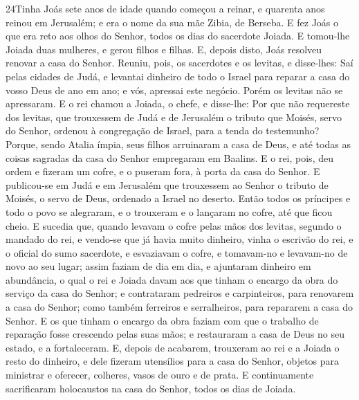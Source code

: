 \lettrine{24} Tinha Joás sete anos de idade quando começou a
reinar, e quarenta anos reinou em Jerusalém; e era o nome da sua mãe
Zibia, de Berseba. E fez Joás o que era reto aos olhos do
Senhor, todos os dias do sacerdote Joiada. E tomou-lhe Joiada
duas mulheres, e gerou filhos e filhas. E, depois disto, Joás
resolveu renovar a casa do Senhor. Reuniu, pois, os sacerdotes e
os levitas, e disse-lhes: Saí pelas cidades de Judá, e levantai
dinheiro de todo o Israel para reparar a casa do vosso Deus de ano
em ano; e vós, apressai este negócio. Porém os levitas não se
apressaram. E o rei chamou a Joiada, o chefe, e disse-lhe: Por
que não requereste dos levitas, que trouxessem de Judá e de
Jerusalém o tributo que Moisés, servo do Senhor, ordenou à
congregação de Israel, para a tenda do testemunho? Porque, sendo
Atalia ímpia, seus filhos arruinaram a casa de Deus, e até todas as
coisas sagradas da casa do Senhor empregaram em Baalins. E o
rei, pois, deu ordem e fizeram um cofre, e o puseram fora, à porta
da casa do Senhor. E publicou-se em Judá e em Jerusalém que
trouxessem ao Senhor o tributo de Moisés, o servo de Deus, ordenado
a Israel no deserto. Então todos os príncipes e todo o povo
se alegraram, e o trouxeram e o lançaram no cofre, até que ficou
cheio. E sucedia que, quando levavam o cofre pelas mãos dos
levitas, segundo o mandado do rei, e vendo-se que já havia muito
dinheiro, vinha o escrivão do rei, e o oficial do sumo sacerdote, e
esvaziavam o cofre, e tomavam-no e levavam-no de novo ao seu lugar;
assim faziam de dia em dia, e ajuntaram dinheiro em abundância,
o qual o rei e Joiada davam aos que tinham o encargo da obra
do serviço da casa do Senhor; e contrataram pedreiros e
carpinteiros, para renovarem a casa do Senhor; como também ferreiros
e serralheiros, para repararem a casa do Senhor. E os que
tinham o encargo da obra faziam com que o trabalho de reparação
fosse crescendo pelas suas mãos; e restauraram a casa de Deus no seu
estado, e a fortaleceram. E, depois de acabarem, trouxeram ao
rei e a Joiada o resto do dinheiro, e dele fizeram utensílios para a
casa do Senhor, objetos para ministrar e oferecer, colheres, vasos
de ouro e de prata. E continuamente sacrificaram holocaustos na casa
do Senhor, todos os dias de Joiada.

